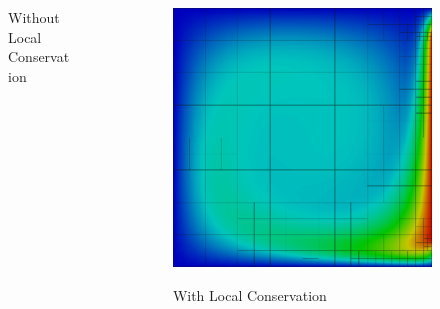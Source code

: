 \documentclass[mathserif]{beamer}
\begin{document}
\begin{frame}
{\begin{columns}[b]
\begin{column}{0.5\textwidth}
\begin{figure}[t]
Without Local Conservation
\end{figure}
\end{column}
\begin{column}{0.5\textwidth}
\begin{figure}[t]
\centering
\includegraphics[width=1.0\textwidth]{../figs/DoubleGlazing/robust6c.png}

With Local Conservation
\end{figure}
\end{column}
\end{columns}
}
\end{frame}

\end{document}
